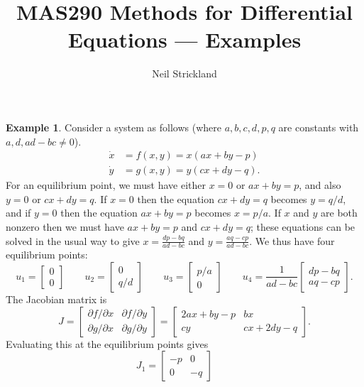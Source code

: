 \documentclass[reqno]{amsart}
\theoremstyle{definition}
\newtheorem{example}[theorem]{Example}
\begin{document}
\title{MAS290 Methods for Differential Equations --- Examples}
\author{Neil Strickland}

\maketitle

\begin{example}\label{eg-cross-quad}
 Consider a system as follows (where $a,b,c,d,p,q$ are constants with
 $a,d,ad-bc\neq 0$).
 \begin{align*}
  \dot{x} &= f(x,y) = x(ax+by-p) \\
  \dot{y} &= g(x,y) = y(cx+dy-q).
 \end{align*}
 For an equilibrium point, we must have either $x=0$ or $ax+by=p$, and
 also $y=0$ or $cx+dy=q$.  If $x=0$ then the equation $cx+dy=q$
 becomes $y=q/d$, and if $y=0$ then the equation $ax+by=p$ becomes
 $x=p/a$.  If $x$ and $y$ are both nonzero then we must have $ax+by=p$
 and $cx+dy=q$; these equations can be solved in the usual way to give
 $x=\frac{dp-bq}{ad-bc}$ and $y=\frac{aq-cp}{ad-bc}$.  We thus have
 four equilibrium points:
 \[ u_1 = \left[\begin{array}{cc} 0\\ 0\end{array}\right] \qquad
    u_2 = \left[\begin{array}{cc} 0\\ q/d\end{array}\right] \qquad
    u_3 = \left[\begin{array}{cc} p/a\\ 0\end{array}\right] \qquad
    u_4 = \frac{1}{ad-bc}\left[\begin{array}{cc} dp-bq \\ aq-cp \end{array}\right].
 \]
 The Jacobian matrix is 
 \[ J = \left[\begin{array}{cc} \partial f/\partial x & \partial f/\partial y \\
             \partial g/\partial x & \partial g/\partial y \end{array}\right]
      = \left[\begin{array}{cc} 2ax+by-p & bx \\
             cy & cx+2dy-q \end{array}\right].
 \]
 Evaluating this at the equilibrium points gives
 \[ J_1 = \left[\begin{array}{cc} -p & 0 \\ 0 & -q \end{array}\right] \qquad
\]
\end{example}
\end{document}
